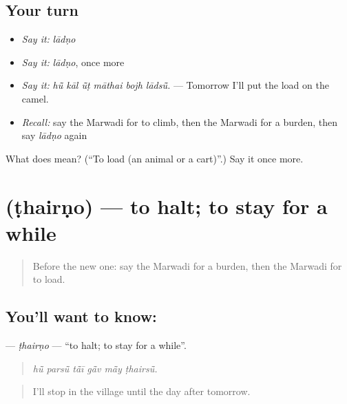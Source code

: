 \subsection*{Your turn}
\begin{itemize}
\raggedright
  \item \emph{Say it:} \emph{lādṇo}
  \item \emph{Say it:} \emph{lādṇo}, once more
  \item \emph{Say it:} \emph{hū̃ kāl ū̃ṭ māthai bojh lādsū̃.} — Tomorrow I'll put the load on the camel.
  \item \emph{Recall:} say the Marwadi for to climb, then the Marwadi for a burden, then say \emph{lādṇo} again
\end{itemize}

\begin{tcolorbox}[breakable,colback=teal!4,colframe=teal!35!black,title={Before you move on}]
What does  mean? (\textquotedblleft{}To load (an animal or a cart)\textquotedblright{}.) Say it once more.
\end{tcolorbox}
\section[\texorpdfstring{\mw{ठैरणो} (ṭhairṇo)}{ठैरणो (ṭhairṇo)}]{ (ṭhairṇo) — to halt; to stay for a while}

\label{lesson:MW-C217-thairno}



\begin{quote}
Before the new one: say the Marwadi for a burden, then the Marwadi for to load.
\end{quote}

\subsection*{You'll want to know: }
\textbf{} — \emph{ṭhairṇo} — \textquotedblleft{}to halt; to stay for a while\textquotedblright{}.

\begin{quote}
     
\end{quote}

\begin{quote}
\emph{hū̃ parsū̃ tā̃ī gā̃v mā̃y ṭhairsū̃.}
\end{quote}

\begin{quote}
I'll stop in the village until the day after tomorrow.
\end{quote}

